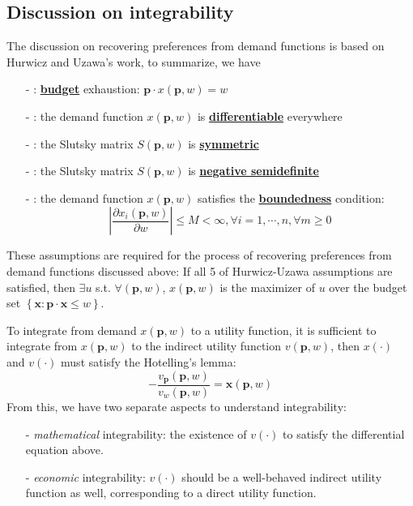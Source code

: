 \subsection{Discussion on integrability}\label{sssec:integrability}
The discussion on recovering preferences from demand functions is based on Hurwicz and Uzawa's work, to summarize, we have
\begin{enumerate}
    \item[-] : \underline{\textbf{budget}} exhaustion: $\mathbf{p}\cdot x(\mathbf{p},w)=w$
    \item[-] : the demand function $x(\mathbf{p},w)$ is \underline{\textbf{differentiable}} everywhere
    \item[-] : the Slutsky matrix $S(\mathbf{p},w)$ is \underline{\textbf{symmetric}}
    \item[-] : the Slutsky matrix $S(\mathbf{p},w)$ is \underline{\textbf{negative semidefinite}}
    \item[-] : the demand function $x(\mathbf{p},w)$ satisfies the \underline{\textbf{boundedness}} condition: $$ \left\vert \frac{\partial x_i(\mathbf{p},w)}{\partial w} \right\vert \leq M < \infty, \forall i=1,\cdots,n,\forall m\geq 0 $$
\end{enumerate}

These assumptions are required for the process of recovering preferences from demand functions discussed above: If all 5 of Hurwicz-Uzawa assumptions are satisfied, then $\exists u$ s.t. $\forall (\mathbf{p},w)$, $x(\mathbf{p},w)$ is the  maximizer of $u$ over the budget set $\left\{ \mathbf{x}: \mathbf{p}\cdot \mathbf{x}\leq w\right\}$.

To integrate from demand $x(\mathbf{p},w)$ to a utility function, it is sufficient to integrate from $x(\mathbf{p},w)$ to the indirect utility function $v(\mathbf{p},w)$, then $x(\cdot)$ and $v(\cdot)$ must satisfy the Hotelling's lemma:
$$
-\frac{v_{\mathbf{p}}(\mathbf{p},w)}{v_{w}(\mathbf{p},w)} = \mathbf{x}(\mathbf{p},w)
$$
From this, we have two separate aspects to understand integrability: 
\begin{enumerate}
    \item[-] \textit{mathematical} integrability: the existence of $v(\cdot)$ to satisfy the differential equation above.
    \item[-] \textit{economic} integrability: $v(\cdot)$ should be a well-behaved indirect utility function as well, corresponding to a direct utility function.
\end{enumerate}

